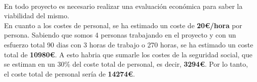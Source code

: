 \documentclass{report}
\begin{document}
        \paragraph*{}
        {
            En todo proyecto es necesario realizar una evaluación económica para saber la viabilidad del mismo.\\

            En cuanto a los costes de personal, se ha estimado un coste de \textbf{20€/hora} por persona.
            Sabiendo que somos 4 personas trabajando en el proyecto y con un esfuerzo total 90 dias con 3 horas de trabajo o 270 horas, se ha estimado un coste total de \textbf{10980€}.
            A esto habria que sumarle los costes de la seguridad social, que se estiman en un 30\% del coste total de personal, es decir, \textbf{3294€}.
            Por lo tanto, el coste total de personal sería de \textbf{14274€}.\\

}
\end{document}
